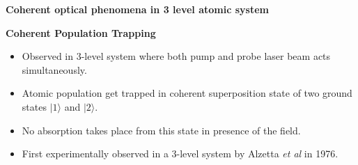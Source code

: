 \documentclass[9pt,aspectratio94]{beamer}
\begin{document}
\begin{frame}
\begin{center}
    \begin{tcolorbox}[arc=3mm, width= 10cm, colback=blue!10!white, halign= center,]
             \textbf{Coherent optical phenomena in 3 level atomic system }
         \end{tcolorbox}
\end{center}
    
\end{frame}

\begin{frame}{\textbf{Coherent Population Trapping}}
\begin{itemize}
    \item Observed in 3-level system where both pump and probe laser beam acts simultaneously. 
    \item Atomic population get trapped in coherent superposition state of two ground states $|1\rangle$ and $|2\rangle$.
    \item No absorption takes place from this state in presence of the field.
    \item First experimentally observed in a 3-level system by Alzetta \textit{et al} in 1976.
    \end{itemize}
\end{frame}
\end{document}
